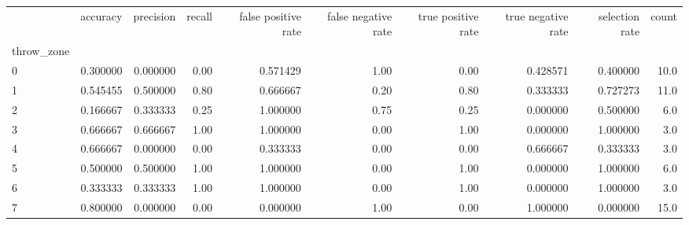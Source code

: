 \begin{tabular}{lrrrrrrrrr}
\toprule
{} &  accuracy &  precision &  recall &  false positive rate &  false negative rate &  true positive rate &  true negative rate &  selection rate &  count \\
throw\_zone &           &            &         &                      &                      &                     &                     &                 &        \\
\midrule
0          &  0.300000 &   0.000000 &    0.00 &             0.571429 &                 1.00 &                0.00 &            0.428571 &        0.400000 &   10.0 \\
1          &  0.545455 &   0.500000 &    0.80 &             0.666667 &                 0.20 &                0.80 &            0.333333 &        0.727273 &   11.0 \\
2          &  0.166667 &   0.333333 &    0.25 &             1.000000 &                 0.75 &                0.25 &            0.000000 &        0.500000 &    6.0 \\
3          &  0.666667 &   0.666667 &    1.00 &             1.000000 &                 0.00 &                1.00 &            0.000000 &        1.000000 &    3.0 \\
4          &  0.666667 &   0.000000 &    0.00 &             0.333333 &                 0.00 &                0.00 &            0.666667 &        0.333333 &    3.0 \\
5          &  0.500000 &   0.500000 &    1.00 &             1.000000 &                 0.00 &                1.00 &            0.000000 &        1.000000 &    6.0 \\
6          &  0.333333 &   0.333333 &    1.00 &             1.000000 &                 0.00 &                1.00 &            0.000000 &        1.000000 &    3.0 \\
7          &  0.800000 &   0.000000 &    0.00 &             0.000000 &                 1.00 &                0.00 &            1.000000 &        0.000000 &   15.0 \\
\bottomrule
\end{tabular}

